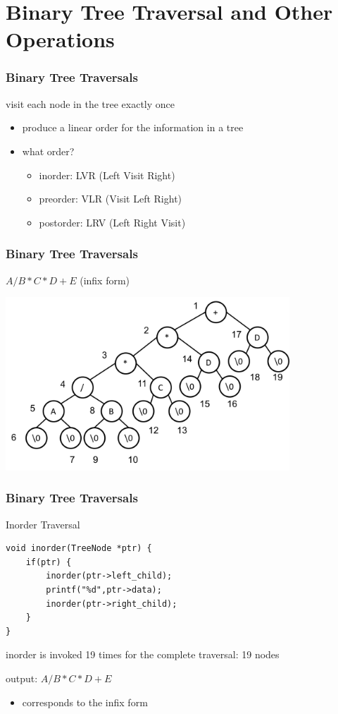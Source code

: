 \documentclass[newPxFont,sthlmFooter,nooffset]{beamer}
\begin{document}
\section{Binary Tree Traversal and Other Operations}
\begin{frame}[t]
  \frametitle{Binary Tree Traversals}
visit each node in the tree exactly once
\begin{itemize}
\item produce a linear order for the information in a tree
\item what order?
  \begin{itemize}
  \item inorder: LVR (Left Visit Right)
  \item preorder: VLR (Visit Left Right)
  \item postorder: LRV (Left Right Visit)
  \end{itemize}
\end{itemize}

\end{frame}


\begin{frame}[t]
  \frametitle{Binary Tree Traversals}
$A/B*C*D+E$ (infix form)
  \begin{center}
    \includegraphics[width=0.8\textwidth]{figures/fig10_infix.png}
  \end{center}

\end{frame}


\begin{frame}[t, fragile]
  \frametitle{Binary Tree Traversals}
Inorder Traversal

\begin{lstlisting}
void inorder(TreeNode *ptr) { 
    if(ptr) {
        inorder(ptr->left_child); 
        printf("%d",ptr->data); 
        inorder(ptr->right_child);
    } 
}  
\end{lstlisting}
inorder is invoked 19 times for the complete traversal: 19 nodes

output: $A/B*C*D+E$
\begin{itemize}
\item  corresponds to the infix form
\end{itemize}

\end{frame}
\end{document}
